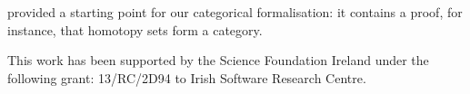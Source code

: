 \cite{iversenUnivalentCategoriesFormalization2018} provided a starting point for
our categorical formalisation: it contains a proof, for instance, that homotopy
sets form a category.
\begin{acks}
  This work has been supported by the Science Foundation Ireland under the
  following grant: 13/RC/2D94 to Irish Software Research Centre.
\end{acks}



 